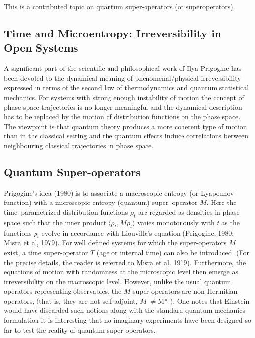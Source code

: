 \documentclass[12pt]{article}
\theoremstyle{plain}
\theoremstyle{definition}
\theoremstyle{plain}
\numberwithin{equation}{section}
\begin{document}
This is a contributed topic on quantum super-operators (or superoperators).


\subsection{Time and Microentropy: Irreversibility in Open Systems}

 A significant part of the scientific and philosophical work of Ilya
Prigogine has been devoted to the dynamical meaning of phenomenal/physical irreversibility
expressed in terms of the second law of thermodynamics and quantum statistical mechanics. 
For systems with strong enough instability of motion the concept of phase space trajectories is
no longer meaningful and the dynamical description has to be
replaced by the motion of distribution functions on the phase
space. The viewpoint is that quantum theory produces a more
coherent type of motion than in the classical setting and the
quantum effects induce correlations between neighbouring classical
trajectories in phase space. 

\subsection{Quantum Super-operators}

 Prigogine's idea (1980) is to associate a macroscopic entropy (or Lyapounov function) 
with a microscopic entropy (quantum) super--operator $M$. Here the time--parametrized distribution
functions $\rho_t$ are regarded as densities in phase space such
that the inner product $\langle \rho_t, M \rho_t\rangle$ varies
monotonously with $t$ as the functions $\rho_t$ evolve in
accordance with Liouville's equation (Prigogine, 1980; Misra et al, 1979). 
For well defined systems for which the super-operators $M$ exist, a time super-operator $T$ (age or internal time) can also be introduced.  (For the precise details, the reader
is referred to Misra et al. 1979). Furthermore, the equations of motion with randomness at the microscopic level then emerge as irreversibility on the macroscopic level. However, unlike the usual quantum operators representing observables, the $M$ super-operators are non-Hermitian operators, (that is, they are not self-adjoint, $M$ $\neq $M* ).  One notes that Einstein would have discarded such notions along with
the standard quantum mechanics formulation it is interesting that no imaginary experiments have been 
designed so far to test the reality of quantum super-operators. 
\end{document}
